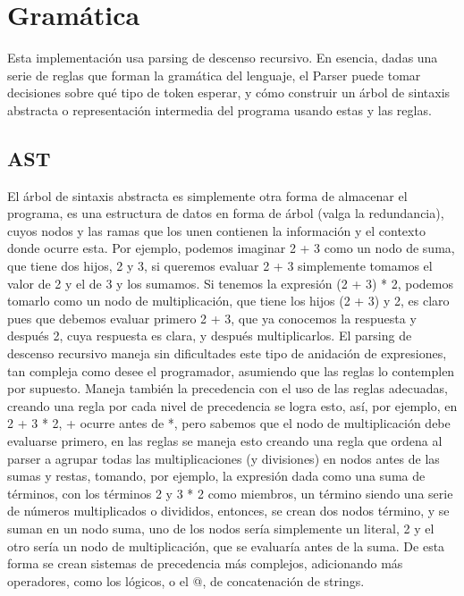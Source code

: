 \documentclass{article}
\begin{document}
\newpage

\section{Gramática}

Esta implementación usa parsing de descenso recursivo. En esencia, dadas una serie de reglas que forman la gramática del lenguaje, el Parser puede tomar decisiones sobre qué tipo de token esperar, y cómo construir un árbol de sintaxis abstracta o representación intermedia del programa usando estas y las reglas. 

\subsection{AST} 
El árbol de sintaxis abstracta es simplemente otra forma de almacenar el programa, es una estructura de datos en forma de árbol (valga la redundancia), cuyos nodos y las ramas que los unen contienen la información y el contexto donde ocurre esta. Por ejemplo, podemos imaginar 2 + 3 como un nodo de suma, que tiene dos hijos, 2 y 3, si queremos evaluar 2 + 3 simplemente tomamos el valor de 2 y el de 3 y los sumamos. Si tenemos la expresión (2 + 3) * 2, podemos tomarlo como un nodo de multiplicación, que tiene los hijos (2 + 3) y 2, es claro pues que debemos evaluar primero 2 + 3, que ya conocemos la respuesta y después 2, cuya respuesta es clara, y después multiplicarlos. El parsing de descenso recursivo maneja sin dificultades este tipo de anidación de expresiones, tan compleja como desee el programador, asumiendo que las reglas lo contemplen por supuesto. Maneja también la precedencia con el uso de las reglas adecuadas, creando una regla por cada nivel de precedencia se logra esto, así, por ejemplo, en 2 + 3 * 2, + ocurre antes de *, pero sabemos que el nodo de multiplicación debe evaluarse primero, en las reglas se maneja esto creando una regla que ordena al parser a agrupar todas las multiplicaciones (y divisiones) en nodos antes de las sumas y restas, tomando, por ejemplo, la expresión dada como una suma de términos, con los términos 2 y 3 * 2 como miembros, un término siendo una serie de números multiplicados o divididos, entonces, se crean dos nodos término, y se suman en un nodo suma, uno de los nodos sería simplemente un literal, 2 y el otro sería un nodo de multiplicación, que se evaluaría antes de la suma. De esta forma se crean sistemas de precedencia más complejos, adicionando más operadores, como los lógicos, o el @, de concatenación de strings.
\end{document}
